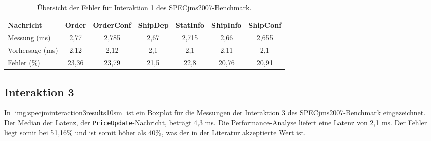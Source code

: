 
\begin{table}
  \begin{tabular}{|l|c|c|c|c|c|c|}
  \hline
    Nachricht & Order & OrderConf & ShipDep & StatInfo & ShipInfo & ShipConf \\
    \hline
    Messung (ms) & 2,77 & 2,785 & 2,67 & 2,715 & 2,66 & 2,655 \\\hline
    Vorhersage (ms) & 2,12 & 2,12 & 2,1 & 2,1 & 2,11 & 2,1 \\\hline
    Fehler (\%)& 23,36 & 23,79 & 21,5 & 22,8 & 20,76 & 20,91 \\\hline
  \end{tabular}
	\caption{\label{tab:interaction1error} Übersicht der Fehler für Interaktion 1 des SPECjms2007-Benchmark.}
\end{table}

\subsection{Interaktion 3}
In \autoref{img:specjminteraction3results10sm} ist ein Boxplot für die Messungen der Interaktion 3 des SPECjms2007-Benchmark eingezeichnet. Der Median der Latenz, der \texttt{PriceUpdate}-Nachricht, beträgt 4,3 ms. Die Performance-Analyse liefert eine Latenz von 2,1 ms. Der Fehler liegt somit bei 51,16\% und ist somit höher als 40\%, was der in der Literatur akzeptierte Wert ist.


